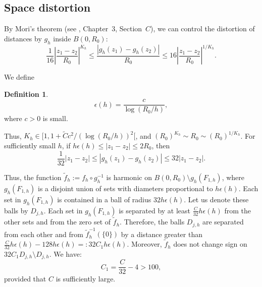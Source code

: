\documentclass[leqno,11pt,letterpaper, english]{amsart}
\theoremstyle{plain}
\theoremstyle{definition}
\newtheorem{defn}[prop]{Definition}
\numberwithin{equation}{section}
\begin{document}
\subsection{Space distortion}
\label{subsect: distortion de lespace}
By Mori's theorem (see \cite{ahlfors2006lectures}, Chapter~$3$, Section~$C$), we can control the distortion of distances by $g_h$ inside $B(0, R_0)$:
\begin{equation}
\frac{1}{16} \left| \frac{z_1 - z_2}{R_0} \right|^{K_h} \leq \frac{|g_h(z_1) - g_h(z_2)|}{R_0} \leq 16 \left| \frac{z_1 - z_2}{R_0} \right|^{1/K_h}.
\label{eq: InegdeMori}
\end{equation}

We define
\begin{defn}
\label{def: epsilon(h)}
\begin{equation}
\epsilon(h) = \frac{c}{\log(R_0 / h)},
\end{equation}
where $c > 0$ is small.
\end{defn}

Thus, $K_h \in [1, 1 + \tilde{C}c^2 / (\log(R_0 / h))^2[$, and $(R_0)^{K_h} \sim R_0 \sim (R_0)^{1/K_h}$. For sufficiently small $h$, if $h\epsilon(h) \leq |z_1 - z_2| \leq 2R_0$, then
\begin{equation}
\frac{1}{32} |z_1 - z_2| \leq |g_h(z_1) - g_h(z_2)| \leq 32 |z_1 - z_2|.
\label{eq: inegsurdistance}
\end{equation}

Thus, the function $\tilde{f}_h := f_h \circ g_h^{-1}$ is harmonic on $B(0, R_0) \setminus g_h(F_{1,h})$, where $g_h(F_{1,h})$ is a disjoint union of sets with diameters proportional to $h\epsilon(h)$. Each set in $g_h(F_{1,h})$ is contained in a ball of radius $32h\epsilon(h)$. Let us denote these balls by $D_{j,h}$. Each set in $g_h(F_{1,h})$ is separated by at least $\frac{C}{32}h\epsilon(h)$ from the other sets and from the zero set of $\tilde{f}_h$. Therefore, the balls $D_{j,h}$ are separated from each other and from $\tilde{f}_h^{-1}(\{0\})$ by a distance greater than $\frac{C}{32}h\epsilon(h) - 128h\epsilon(h) =: 32C_1h\epsilon(h)$. Moreover, $\tilde{f}_h$ does not change sign on $32C_1D_{j,h} \setminus D_{j,h}$. We have:
\begin{equation}
C_1 = \frac{C}{32} - 4 > 100,
\end{equation}
provided that $C$ is sufficiently large.
\end{document}
